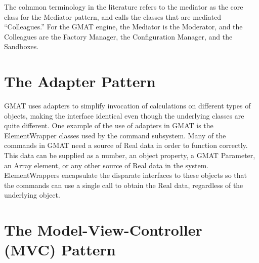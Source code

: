 The colmmon terminology in the literature refers to the mediator as the core class for the Mediator
pattern, and calls the classes that are mediated ``Colleagues.''  For the GMAT engine, the Mediator
is the Moderator, and the Colleagues are the Factory Manager, the Configuration Manager, and the
Sandboxes.

\section{\label{section:TheAdapterPattern}The Adapter Pattern}

GMAT uses adapters to simplify invocation of calculations on different types of objects, making the
interface identical even though the underlying classes are quite different.  One example of the use
of adapters in GMAT is the ElementWrapper classes used by the command subsystem.  Many of the
commands in GMAT need a source of Real data in order to function correctly.  This data can be
supplied as a number, an object property, a GMAT Parameter, an Array element, or any other source of
Real data in the system.  ElementWrappers encapsulate the disparate interfaces to these objects so
that the commands can use a single call to obtain the Real data, regardless of the underlying
object.

\section{\label{section:TheMVCPattern}The Model-View-Controller (MVC) Pattern}
